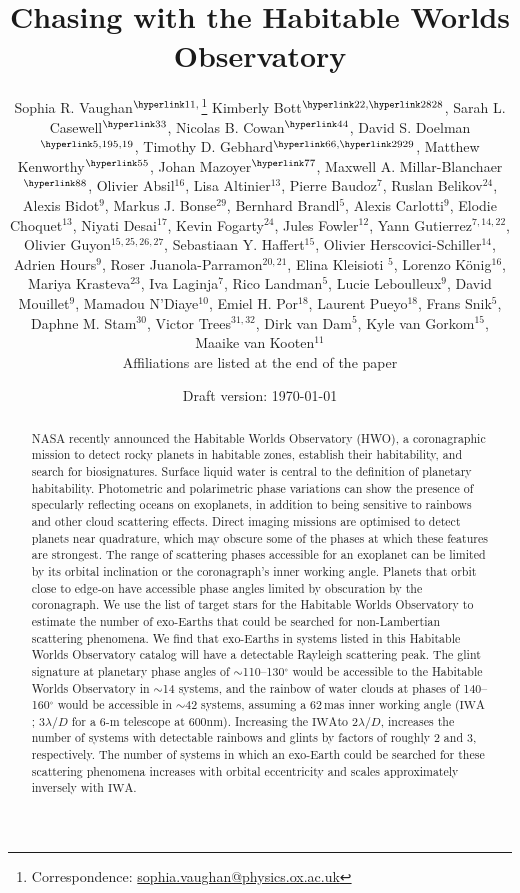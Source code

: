 \documentclass[
    usenatbib,
]{mnras}
\title{Chasing \rainbows{} with the Habitable Worlds Observatory}
\author[Sophia R. Vaughan et al.]{%
    Sophia R. Vaughan$^{\affiliationlink{1},}$\thanks{Correspondence:  \url{sophia.vaughan@physics.ox.ac.uk}}
    Kimberly Bott$^{\affiliationlink{2},\affiliationlink{28}}$,
    Sarah L. Casewell$^{\affiliationlink{3}}$,
    Nicolas B. Cowan$^{\affiliationlink{4}}$,
    David S. Doelman$^{\affiliationlink{5,19}}$,
    \newauthor 
    Timothy D. Gebhard$^{\affiliationlink{6},\affiliationlink{29}}$,
    Matthew Kenworthy$^{\affiliationlink{5}}$,
    Johan Mazoyer$^{\affiliationlink{7}}$,
    Maxwell A. Millar-Blanchaer$^{\affiliationlink{8}}$,
    \newauthor 
    Olivier Absil$^{16}$,
    Lisa Altinier$^{13}$,
    Pierre Baudoz$^{7}$,
    Ruslan Belikov$^{24}$,
    Alexis Bidot$^{9}$,
    Markus J. Bonse$^{29}$,
    \newauthor 
    Bernhard Brandl$^{5}$,
    Alexis Carlotti$^{9}$,
    Elodie Choquet$^{13}$,
    Niyati Desai$^{17}$,
    Kevin Fogarty$^{24}$,
    Jules Fowler$^{12}$,
    \newauthor
    Yann Gutierrez$^{7,14,22}$,
    Olivier Guyon$^{15,25,26,27}$,
    Sebastiaan Y. Haffert$^{15}$,
    Olivier Herscovici-Schiller$^{14}$, 
    \newauthor
    Adrien Hours$^{9}$,
    Roser Juanola-Parramon$^{20,21}$,
    Elina Kleisioti $^{5}$,
    Lorenzo König$^{16}$,
    Mariya Krasteva$^{23}$, 
    \newauthor
    Iva Laginja$^{7}$,
    Rico Landman$^{5}$,
    Lucie Leboulleux$^{9}$,
    David Mouillet$^{9}$,
    Mamadou N’Diaye$^{10}$,
    Emiel H. Por$^{18}$,
    \newauthor
    Laurent Pueyo$^{18}$,
    Frans Snik$^{5}$,
    Daphne M. Stam$^{30}$,
    Victor Trees$^{31,32}$,
    Dirk van Dam$^{5}$,
    Kyle van Gorkom$^{15}$,
    \newauthor
    Maaike van Kooten$^{11}$ 
    \newauthor \\%
    Affiliations are listed at the end of the paper
}
\date{Draft version: \today}
\newcommand{\IWA}{\ensuremath{\mathrm{IWA}}}
\begin{document}
 

\maketitle

\begin{abstract}
NASA recently announced the Habitable Worlds Observatory (HWO), a coronagraphic mission to detect rocky planets in habitable zones, establish their habitability, and search for biosignatures. 
Surface liquid water is central to the definition of planetary habitability.
%
Photometric and polarimetric phase variations can show the presence of specularly reflecting oceans on exoplanets, in addition to being sensitive to rainbows and other cloud scattering effects. 
%
Direct imaging missions are optimised to detect planets near quadrature, which may obscure some of the phases at which these features are strongest. 
%
The range of scattering phases accessible for an exoplanet can be limited by its orbital inclination or the coronagraph's inner working angle. 
%
Planets that orbit close to edge-on have accessible phase angles limited by obscuration by the coronagraph. 
%
We use the list of target stars for the Habitable Worlds Observatory to estimate the number of exo-Earths that could be searched for non-Lambertian scattering phenomena. 
%
We find that exo-Earths in systems listed in this Habitable Worlds Observatory catalog will have a detectable Rayleigh scattering peak. 
%
The glint signature at planetary phase angles of 
$\sim$110--130$^\circ$ would be accessible to the Habitable Worlds Observatory in $\sim$14 systems, and the rainbow of water clouds at phases of 140--160$^\circ$ would be accessible in $\sim$42 systems, assuming a 62\,mas inner working angle (\IWA; 3$\lambda/D$ for a 6-m telescope at 600nm).
%
Increasing the \IWA to 2$\lambda/D$, increases the number of systems with detectable rainbows and glints by factors of roughly 2 and 3, respectively.
%
The number of systems in which an exo-Earth could be searched for these scattering phenomena increases with orbital eccentricity and scales approximately inversely with \IWA.     \end{abstract}
\end{document}

